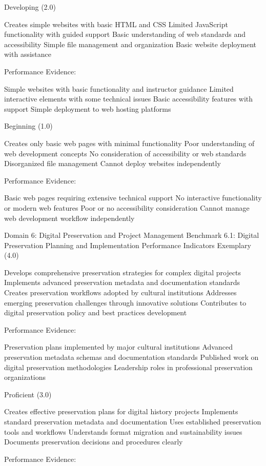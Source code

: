 \begin{appendices}
Developing (2.0)

Creates simple websites with basic HTML and CSS
Limited JavaScript functionality with guided support
Basic understanding of web standards and accessibility
Simple file management and organization
Basic website deployment with assistance

Performance Evidence:

Simple websites with basic functionality and instructor guidance
Limited interactive elements with some technical issues
Basic accessibility features with support
Simple deployment to web hosting platforms

Beginning (1.0)

Creates only basic web pages with minimal functionality
Poor understanding of web development concepts
No consideration of accessibility or web standards
Disorganized file management
Cannot deploy websites independently

Performance Evidence:

Basic web pages requiring extensive technical support
No interactive functionality or modern web features
Poor or no accessibility consideration
Cannot manage web development workflow independently


Domain 6: Digital Preservation and Project Management
Benchmark 6.1: Digital Preservation Planning and Implementation
Performance Indicators
Exemplary (4.0)

Develops comprehensive preservation strategies for complex digital projects
Implements advanced preservation metadata and documentation standards
Creates preservation workflows adopted by cultural institutions
Addresses emerging preservation challenges through innovative solutions
Contributes to digital preservation policy and best practices development

Performance Evidence:

Preservation plans implemented by major cultural institutions
Advanced preservation metadata schemas and documentation standards
Published work on digital preservation methodologies
Leadership roles in professional preservation organizations

Proficient (3.0)

Creates effective preservation plans for digital history projects
Implements standard preservation metadata and documentation
Uses established preservation tools and workflows
Understands format migration and sustainability issues
Documents preservation decisions and procedures clearly

Performance Evidence:


\end{appendices}
